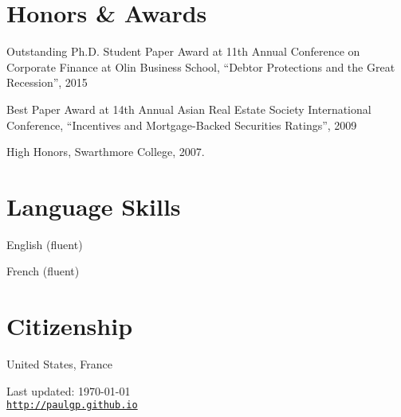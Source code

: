 \documentclass[letterpaper]{article}
\renewenvironment{itemize}{
  \begin{list}{}
    { \setlength{\itemsep}{5pt}
      \setlength{\parsep}{0pt}
      \setlength{\topsep}{0pt}
      \setlength{\leftmargin}{0em} } }{
  \end{list}}
\begin{document}
\section*{Honors \& Awards}
\begin{itemize}
\item Outstanding Ph.D. Student Paper Award at 11th Annual Conference
  on Corporate Finance at Olin Business School, ``Debtor Protections
  and the Great Recession'', 2015
\item Best Paper Award at 14th Annual Asian Real Estate Society
  International Conference, ``Incentives and Mortgage-Backed
  Securities Ratings'', 2009
\item High Honors, Swarthmore College, 2007.
\end{itemize}

\section*{Language Skills}
\begin{itemize}
\item English (fluent)
\item French (fluent)
\end{itemize}
\bigskip

\section*{Citizenship}
United States, France
\begin{center}
\begin{footnotesize}
Last updated: \today \\
\href{http://paulgp.github.io}{\tt http://paulgp.github.io}
\end{footnotesize}
\end{center}
\end{document}
